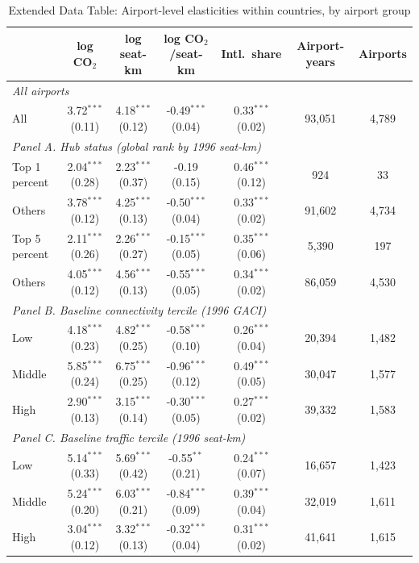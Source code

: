 \begin{table}[htbp]
\centering
\begin{threeparttable}
\caption{Extended Data Table: Airport-level elasticities within countries, by airport group}
\label{tab:airport_het}
\scriptsize
\begin{tabular}{lcccccc}
\toprule
 & log CO$_2$ & log seat-km & log CO$_2$/seat-km & Intl.\ share & Airport-years & Airports \\
\midrule
\multicolumn{7}{l}{\textit{All airports}} \\
  All & 3.72$^{***}$ (0.11) & 4.18$^{***}$ (0.12) & -0.49$^{***}$ (0.04) & 0.33$^{***}$ (0.02) & 93,051 & 4,789 \\
\multicolumn{7}{l}{\textit{Panel A. Hub status (global rank by 1996 seat-km)}} \\
  Top 1 percent & 2.04$^{***}$ (0.28) & 2.23$^{***}$ (0.37) & -0.19 (0.15) & 0.46$^{***}$ (0.12) & 924 & 33 \\
  Others & 3.78$^{***}$ (0.12) & 4.25$^{***}$ (0.13) & -0.50$^{***}$ (0.04) & 0.33$^{***}$ (0.02) & 91,602 & 4,734 \\
  Top 5 percent & 2.11$^{***}$ (0.26) & 2.26$^{***}$ (0.27) & -0.15$^{***}$ (0.05) & 0.35$^{***}$ (0.06) & 5,390 & 197 \\
  Others & 4.05$^{***}$ (0.12) & 4.56$^{***}$ (0.13) & -0.55$^{***}$ (0.05) & 0.34$^{***}$ (0.02) & 86,059 & 4,530 \\
\multicolumn{7}{l}{\textit{Panel B. Baseline connectivity tercile (1996 GACI)}} \\
  Low & 4.18$^{***}$ (0.23) & 4.82$^{***}$ (0.25) & -0.58$^{***}$ (0.10) & 0.26$^{***}$ (0.04) & 20,394 & 1,482 \\
  Middle & 5.85$^{***}$ (0.24) & 6.75$^{***}$ (0.25) & -0.96$^{***}$ (0.12) & 0.49$^{***}$ (0.05) & 30,047 & 1,577 \\
  High & 2.90$^{***}$ (0.13) & 3.15$^{***}$ (0.14) & -0.30$^{***}$ (0.05) & 0.27$^{***}$ (0.02) & 39,332 & 1,583 \\
\multicolumn{7}{l}{\textit{Panel C. Baseline traffic tercile (1996 seat-km)}} \\
  Low & 5.14$^{***}$ (0.33) & 5.69$^{***}$ (0.42) & -0.55$^{**}$ (0.21) & 0.24$^{***}$ (0.07) & 16,657 & 1,423 \\
  Middle & 5.24$^{***}$ (0.20) & 6.03$^{***}$ (0.21) & -0.84$^{***}$ (0.09) & 0.39$^{***}$ (0.04) & 32,019 & 1,611 \\
  High & 3.04$^{***}$ (0.12) & 3.32$^{***}$ (0.13) & -0.32$^{***}$ (0.04) & 0.31$^{***}$ (0.02) & 41,641 & 1,615 \\

\end{tabular}
\end{threeparttable}
\end{table}
